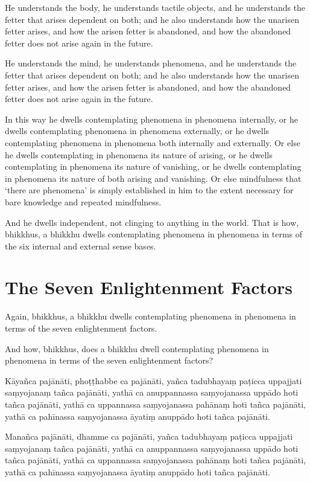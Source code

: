 \englishPage

He understands the body, he understands tactile objects, and he understands the
fetter that arises dependent on both; and he also understands how the unarisen
fetter arises, and how the arisen fetter is abandoned, and how the abandoned
fetter does not arise again in the future.

He understands the mind, he understands phenomena, and he understands the fetter
that arises dependent on both; and he also understands how the unarisen fetter
arises, and how the arisen fetter is abandoned, and how the abandoned fetter
does not arise again in the future.

In this way he dwells contemplating phenomena in phenomena internally, or he
dwells contemplating phenomena in phenomena externally, or he dwells
contemplating phenomena in phenomena both internally and externally. Or else he
dwells contemplating in phenomena its nature of arising, or he dwells
contemplating in phenomena its nature of vanishing, or he dwells contemplating
in phenomena its nature of both arising and vanishing. Or else mindfulness that
‘there are phenomena’ is simply established in him to the extent necessary for
bare knowledge and repeated mindfulness.

And he dwells independent, not clinging to anything in the world. That is how,
bhikkhus, a bhikkhu dwells contemplating phenomena in phenomena in terms of the
six internal and external sense bases.


\section{The Seven Enlightenment Factors}

Again, bhikkhus, a bhikkhu dwells contemplating phenomena in phenomena in terms
of the seven enlightenment factors.

And how, bhikkhus, does a bhikkhu dwell contemplating phenomena in phenomena in
terms of the seven enlightenment factors?

\paliPage

Kāyañca pajānāti,
phoṭṭhabbe ca pajānāti,
yañca tadubhayaṃ paṭicca uppajjati saṃyojanaṃ tañca pajānāti,
yathā ca anuppannassa saṃyojanassa uppādo hoti tañca pajānāti,
yathā ca uppannassa saṃyojanassa pahānaṃ hoti tañca pajānāti,
yathā ca pahīnassa saṃyojanassa āyatiṃ anuppādo hoti tañca pajānāti.

Manañca pajānāti,
dhamme ca pajānāti,
yañca tadubhayaṃ paṭicca uppajjati saṃyojanaṃ tañca pajānāti,
yathā ca anuppannassa saṃyojanassa uppādo hoti tañca pajānāti,
yathā ca uppannassa saṃyojanassa pahānaṃ hoti tañca pajānāti,
yathā ca pahīnassa saṃyojanassa āyatiṃ anuppādo hoti tañca pajānāti.

